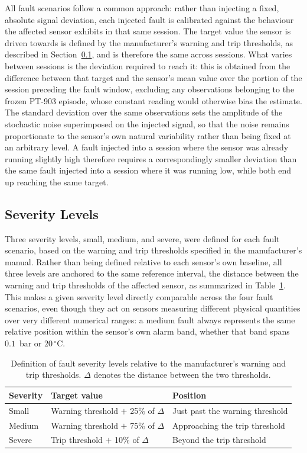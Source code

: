 All fault scenarios follow a common approach: rather than injecting a fixed, absolute signal deviation, 
each injected fault is calibrated against the behaviour the affected sensor exhibits in that same session. 
The target value the sensor is driven towards is defined by the manufacturer's warning and trip 
thresholds, as described in Section~\ref{sec:fault_severity}, and is therefore the same across sessions. 
What varies between sessions is the deviation required to reach it: this is obtained from the difference 
between that target and the sensor's mean value over the portion of the session preceding the fault 
window, excluding any observations belonging to the frozen PT-903 episode, whose constant reading would 
otherwise bias the estimate. The standard deviation over the same observations sets the amplitude of the 
stochastic noise superimposed on the injected signal, so that the noise remains proportionate to the 
sensor's own natural variability rather than being fixed at an arbitrary level. A fault injected into a 
session where the sensor was already running slightly high therefore requires a correspondingly smaller 
deviation than the same fault injected into a session where it was running low, while both end up 
reaching the same target.

\subsection{Severity Levels} \label{sec:fault_severity}

Three severity levels, small, medium, and severe, were defined for each fault scenario, based on the
warning and trip thresholds specified in the manufacturer's manual. Rather than being defined relative to
each sensor's own baseline, all three levels are anchored to the same reference interval, the distance
between the warning and trip thresholds of the affected sensor, as summarized in
Table~\ref{tab:fault_severity}. This makes a given severity level directly comparable across the four
fault scenarios, even though they act on sensors measuring different physical quantities over very
different numerical ranges: a medium fault always represents the same relative position within the
sensor's own alarm band, whether that band spans $0.1$~bar or $20\,^\circ$C.

\begin{table}[htbp]
\centering
\caption{Definition of fault severity levels relative to the manufacturer's warning and trip thresholds.
$\Delta$ denotes the distance between the two thresholds.}
\label{tab:fault_severity}
\begin{tabular}{lll}
\hline
\textbf{Severity} & \textbf{Target value} & \textbf{Position} \\
\hline
Small  & Warning threshold $+$ 25\% of $\Delta$ & Just past the warning threshold \\
Medium & Warning threshold $+$ 75\% of $\Delta$ & Approaching the trip threshold \\
Severe & Trip threshold $+$ 10\% of $\Delta$    & Beyond the trip threshold \\
\hline
\end{tabular}
\end{table}

